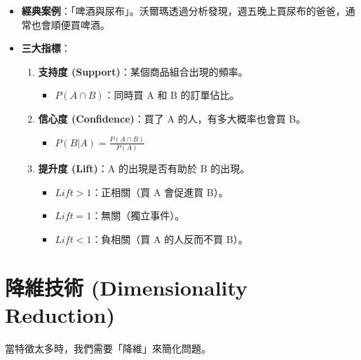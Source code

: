 \documentclass[
  letterpaper,
  DIV=11,
  numbers=noendperiod]{scrreprt}
\providecommand{\tightlist}{%
  \setlength{\itemsep}{0pt}\setlength{\parskip}{0pt}}
\begin{document}
\begin{itemize}
\tightlist
\item
  \textbf{經典案例}：「啤酒與尿布」。沃爾瑪透過分析發現，週五晚上買尿布的爸爸，通常也會順便買啤酒。
\item
  \textbf{三大指標}：

  \begin{enumerate}
  \def\labelenumi{\arabic{enumi}.}
  \tightlist
  \item
    \textbf{支持度 (Support)}：某個商品組合出現的頻率。

    \begin{itemize}
    \tightlist
    \item
      \(P(A \cap B)\)：同時買 A 和 B 的訂單佔比。
    \end{itemize}
  \item
    \textbf{信心度 (Confidence)}：買了 A 的人，有多大概率也會買 B。

    \begin{itemize}
    \tightlist
    \item
      \(P(B|A) = \frac{P(A \cap B)}{P(A)}\)
    \end{itemize}
  \item
    \textbf{提升度 (Lift)}：A 的出現是否有助於 B 的出現。

    \begin{itemize}
    \tightlist
    \item
      \(Lift > 1\)：正相關（買 A 會促進買 B）。
    \item
      \(Lift = 1\)：無關（獨立事件）。
    \item
      \(Lift < 1\)：負相關（買 A 的人反而不買 B）。
    \end{itemize}
  \end{enumerate}
\end{itemize}

\section{降維技術 (Dimensionality
Reduction)}\label{ux964dux7dadux6280ux8853-dimensionality-reduction}

當特徵太多時，我們需要「降維」來簡化問題。
\end{document}
